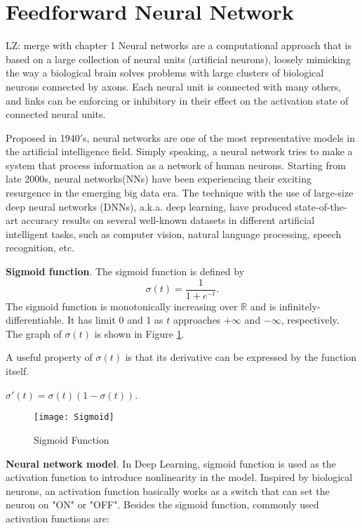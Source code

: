 \section{Feedforward Neural Network}{\color{red}LZ: merge with chapter 1}
Neural networks are a computational approach that is based on a large collection of neural units (artificial neurons), loosely mimicking the way a biological brain solves problems with large clusters of biological neurons connected by axons. Each neural unit is connected with many others, and links can be enforcing or inhibitory in their effect on the activation state of connected neural units.

Proposed in 1940$'$s, neural networks are one of the most representative models in the artificial intelligence field. Simply speaking, a neural network tries to make a system that process information as a network of human neurons. Starting from late 2000s, neural networks(NNs) have been experiencing their exciting resurgence in the emerging big data era. The technique with the use of large-size deep neural networks (DNNs), a.k.a. deep learning, have produced state-of-the-art accuracy results on several well-known datasets in different artificial intelligent tasks, such as computer vision, natural language processing, speech recognition, etc.

{\bf Sigmoid function}. The sigmoid function is defined by
\begin{equation}
\sigma(t) = \frac{1}{1+e^{-t}}.
\end{equation}
The sigmoid function is monotonically increasing over $\mathbb{R}$ and is infinitely-differentiable. It has limit 0 and 1 as $t$ approaches $+\infty$ and $-\infty$, respectively. The graph of $\sigma(t)$ is shown in Figure \ref{fsig}.

A useful property of $\sigma(t)$ is that its derivative can be expressed by the function itself.

\begin{lemma}
\label{lsig}
$\sigma'(t) = \sigma(t)(1-\sigma(t))$.
\end{lemma}


\begin{figure}\label{fsig}
\centering
\texttt{[image: Sigmoid]}
\caption{Sigmoid Function}
\end{figure}

{\bf Neural network model}. In Deep Learning, sigmoid function is used as the activation function to introduce nonlinearity in the model. Inspired by biological neurons, an activation function basically works as a switch that can set the neuron on "ON" or "OFF". Besides the sigmoid function, commonly used activation functions are:

